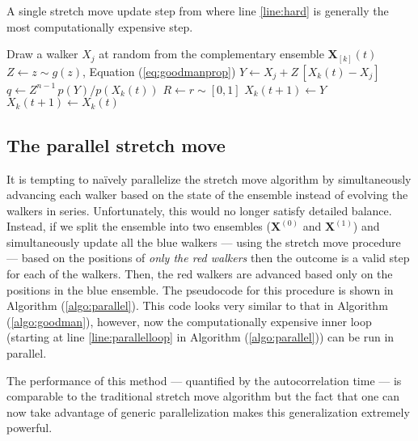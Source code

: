 \documentclass[12pt,preprint]{aastex}
\newcommand{\Eq}[1]{Equation (\ref{eq:#1})}
\newcommand{\eq}[1]{Equation (\ref{eq:#1})}
\newcommand{\sectlabel}[1]{\label{sect:#1}}
\newcommand{\algo}[1]{Algorithm (\ref{algo:#1})}
\newcommand{\algolabel}[1]{\label{algo:#1}}
\begin{document}
\begin{algorithm}
\caption{A single stretch move update step from \citet{Goodman:2010} where
    line \ref{line:hard} is generally the most computationally expensive
    step. \algolabel{goodman}}
\begin{algorithmic}[1]
    \STATE Draw a walker $X_j$ at random from the complementary ensemble %
        $\mathbf{X}_{[k]}(t)$
    \STATE $Z \gets z \sim g(z)$, \Eq{goodmanprop}
    \STATE $Y \gets X_j + Z \, [ X_k (t) - X_j]$
    \STATE $q \gets Z^{n-1} \, p(Y)/p(X_k(t))$ \label{line:hard}
    \STATE $R \gets r \sim [0, 1]$
    \IF{$R \ge q$, \eq{acceptance}}
        \STATE $X_k(t+1) \gets Y$
    \ELSE
        \STATE $X_k(t+1) \gets X_k(t)$
    \ENDIF
\ENDFOR
\end{algorithmic}
\end{algorithm}

\subsection{The parallel stretch move}
\sectlabel{parallel}

It is tempting to na\"ively parallelize the stretch move algorithm by
simultaneously advancing each walker based on the state of the ensemble
instead of evolving the walkers in series. Unfortunately, this would no
longer satisfy detailed balance. Instead, if we split the ensemble into two
ensembles ($\mathbf{X}^{(0)}$ and $\mathbf{X}^{(1)}$) and
simultaneously update all the blue walkers --- using the stretch move
procedure --- based on the positions of \emph{only the red walkers} then the
outcome is a valid step for each of the walkers. Then, the red walkers are
advanced based only on the positions in the blue ensemble. The pseudocode for
this procedure is shown in \algo{parallel}. This code looks very similar to
that in \algo{goodman}, however, now the computationally expensive inner loop
(starting at line \ref{line:parallelloop} in \algo{parallel}) can be run in
parallel.

The performance of this method --- quantified by the autocorrelation time ---
is comparable to the traditional stretch move algorithm but the fact that one
can now take advantage of generic parallelization makes this generalization
extremely powerful.
\end{document}
